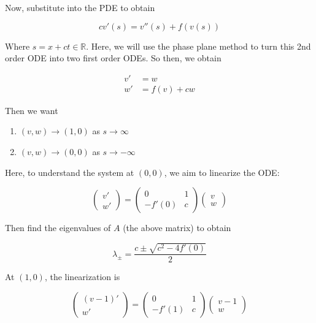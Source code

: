 \documentclass{article}
\newtheorem{one minute paper}[theorem]{One Minute Paper}
\begin{document}
Now, substitute into the PDE to obtain 

\begin{equation}
    cv'(s) = v''(s) + f(v(s))
\end{equation}

Where $s = x + ct \in \mathbb{R}$. Here, we will use the phase plane method to turn this 2nd order 
ODE into two first order ODEs. So then, we obtain 

\begin{align}
    v' &= w \\
    w' &= f(v) + cw
\end{align}

Then we want 

\begin{enumerate}
    \item $(v,w) \rightarrow (1,0)$ as $s \rightarrow \infty$
    \item $(v,w) \rightarrow (0,0)$ as $s \rightarrow -\infty$
\end{enumerate}

Here, to understand the system at $(0,0)$, we aim to linearize the ODE: 

\begin{equation}
    \begin{pmatrix}
        v'\\
        w'
    \end{pmatrix} = \begin{pmatrix}
        0 & 1 \\
        -f'(0) & c
    \end{pmatrix}\begin{pmatrix}
        v \\
        w
    \end{pmatrix}
\end{equation}

Then find the eigenvalues of $A$ (the above matrix) to obtain

\begin{equation}
    \lambda_{\pm} = \frac{c \pm \sqrt{c^2 - 4f'(0)}}{2}
\end{equation}

At $(1,0)$, the linearization is 

\begin{equation}
    \begin{pmatrix}
        (v - 1)'\\
        w'
    \end{pmatrix} = \begin{pmatrix}
         0 & 1 \\
         -f'(1) & c
    \end{pmatrix}\begin{pmatrix}
        v - 1\\
        w
    \end{pmatrix}
\end{equation}
\end{document}
